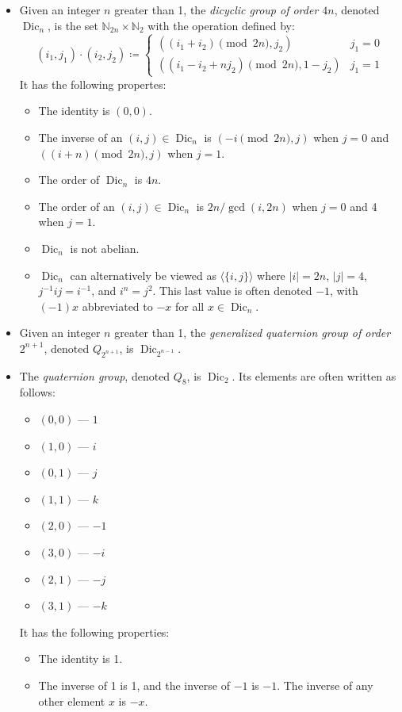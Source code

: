 \documentclass{article}
\newcommand{\N}{\mathbb{N}}
\DeclareMathOperator{\Dic}{Dic}
\newcommand{\gen}[1]{\langle #1\rangle}
\begin{document}
\begin{itemize}
\item Given an integer $n$ greater than 1, the \emph{dicyclic group of order $4n$}, denoted $\Dic_n$, is the set $\N_{2n}\times\N_2$ with the operation defined by: $$(i_1, j_1)\cdot(i_2, j_2)\coloneqq \begin{cases}((i_1 + i_2) \pmod{2n}, j_2) & j_1 = 0 \\ ((i_1 - i_2 + nj_2) \pmod{2n}, 1-j_2) & j_1 = 1\end{cases}$$  It has the following propertes:
 \begin{itemize}
 \item The identity is $(0,0)$.
 \item The inverse of an $(i,j)\in\Dic_n$ is $(-i\pmod{2n}, j)$ when $j=0$ and $((i+n)\pmod{2n}, j)$ when $j=1$.
 \item The order of $\Dic_n$ is $4n$.
 \item The order of an $(i,j)\in\Dic_n$ is $2n/\gcd(i,2n)$ when $j=0$ and 4 when $j=1$.
 \item $\Dic_n$ is not abelian.
 \item $\Dic_n$ can alternatively be viewed as $\gen{\{i,j\}}$ where $|i| = 2n$, $|j| = 4$, $j^{-1}ij = i^{-1}$, and $i^n = j^2$.  This last value is often denoted $-1$, with $(-1)x$ abbreviated to $-x$ for all $x\in\Dic_n$.
 \end{itemize}
\item Given an integer $n$ greater than 1, the \emph{generalized quaternion group of order $2^{n+1}$}, denoted $Q_{2^{n+1}}$, is $\Dic_{2^{n-1}}$.
\item The \emph{quaternion group}, denoted $Q_8$, is $\Dic_2$.  Its elements are often written as follows:
 \begin{itemize}
 \item $(0,0)$ --- $1$
 \item $(1,0)$ --- $i$
 \item $(0,1)$ --- $j$
 \item $(1,1)$ --- $k$
 \item $(2,0)$ --- $-1$
 \item $(3,0)$ --- $-i$
 \item $(2,1)$ --- $-j$
 \item $(3,1)$ --- $-k$
 \end{itemize}
 It has the following properties:
 \begin{itemize}
 \item The identity is 1.
 \item The inverse of 1 is 1, and the inverse of $-1$ is $-1$.  The inverse of any other element $x$ is $-x$.

\end{itemize}
\end{itemize}
\end{document}
